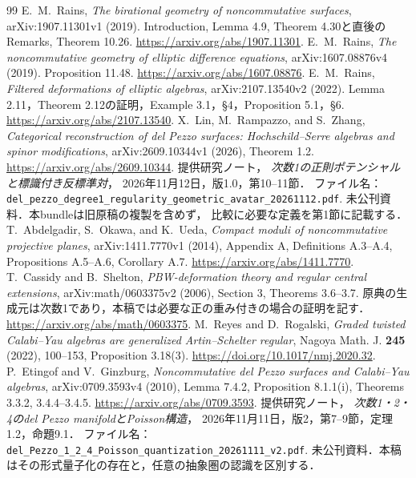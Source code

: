 \documentclass[11pt,a4paper]{ltjsarticle}
\theoremstyle{definition}
\begin{document}
\begin{thebibliography}{99}
E.~M.~Rains,
\emph{The birational geometry of noncommutative surfaces},
arXiv:1907.11301v1 (2019).
Introduction, Lemma 4.9, Theorem 4.30と直後のRemarks,
Theorem 10.26.
\url{https://arxiv.org/abs/1907.11301}.
E.~M.~Rains,
\emph{The noncommutative geometry of elliptic difference equations},
arXiv:1607.08876v4 (2019).
Proposition 11.48.
\url{https://arxiv.org/abs/1607.08876}.
E.~M.~Rains,
\emph{Filtered deformations of elliptic algebras},
arXiv:2107.13540v2 (2022).
Lemma 2.11，Theorem 2.12の証明，Example 3.1，\S4，Proposition 5.1，\S6.
\url{https://arxiv.org/abs/2107.13540}.
X.~Lin, M.~Rampazzo, and S.~Zhang,
\emph{Categorical reconstruction of del Pezzo surfaces:
Hochschild--Serre algebras and spinor modifications},
arXiv:2609.10344v1 (2026), Theorem 1.2.
\url{https://arxiv.org/abs/2609.10344}.
提供研究ノート，
\emph{次数1の正則ポテンシャルと標識付き反標準対}，
2026年11月12日，版1.0，第10--11節．
ファイル名：
\texttt{del\_pezzo\_degree1\_regularity\_geometric\_avatar\_20261112.pdf}.
未公刊資料．本bundleは旧原稿の複製を含めず，
比較に必要な定義を第1節に記載する．
T.~Abdelgadir, S.~Okawa, and K.~Ueda,
\emph{Compact moduli of noncommutative projective planes},
arXiv:1411.7770v1 (2014), Appendix A,
Definitions A.3--A.4, Propositions A.5--A.6, Corollary A.7.
\url{https://arxiv.org/abs/1411.7770}.
T.~Cassidy and B.~Shelton,
\emph{PBW-deformation theory and regular central extensions},
arXiv:math/0603375v2 (2006), Section 3, Theorems 3.6--3.7.
原典の生成元は次数1であり，本稿では必要な正の重み付きの場合の証明を記す．
\url{https://arxiv.org/abs/math/0603375}.
M.~Reyes and D.~Rogalski,
\emph{Graded twisted Calabi--Yau algebras are generalized Artin--Schelter regular},
Nagoya Math. J. \textbf{245} (2022), 100--153,
Proposition 3.18(3).
\url{https://doi.org/10.1017/nmj.2020.32}.
P.~Etingof and V.~Ginzburg,
\emph{Noncommutative del Pezzo surfaces and Calabi--Yau algebras},
arXiv:0709.3593v4 (2010), Lemma 7.4.2, Proposition 8.1.1(i),
Theorems 3.3.2, 3.4.4--3.4.5.
\url{https://arxiv.org/abs/0709.3593}.
提供研究ノート，
\emph{次数1・2・4のdel Pezzo manifoldとPoisson構造}，
2026年11月11日，版2，第7--9節，定理1.2，命題9.1．
ファイル名：\texttt{del\_Pezzo\_1\_2\_4\_Poisson\_quantization\_20261111\_v2.pdf}.
未公刊資料．本稿はその形式量子化の存在と，任意の抽象圏の認識を区別する．
\end{thebibliography}
\endgroup
\end{document}
